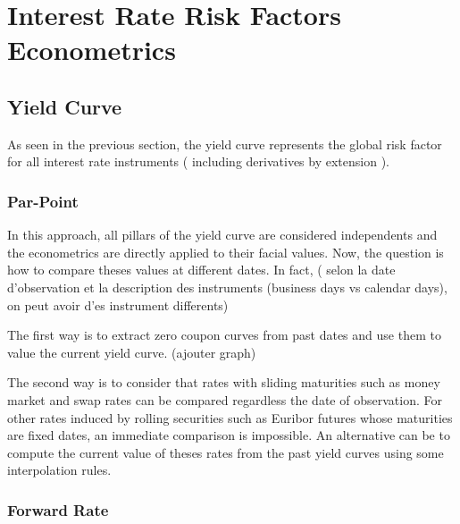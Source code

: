 \documentclass[3pt]{article}
\begin{document}
\bigskip

\bigskip

\bigskip

\bigskip

\bigskip

\bigskip

\bigskip

\section{Interest Rate Risk Factors Econometrics}

\subsection{Yield Curve}

\bigskip As seen in the previous section, the yield curve represents the
global risk factor for all interest rate instruments ( including derivatives
by extension ).

\subsubsection{Par-Point}

In this approach, all pillars of the yield curve are considered independents
and the econometrics are directly applied to their facial values. Now, the
question is how to compare theses values at different dates. In fact, (
selon la date d'observation et la description des instruments (business days
vs calendar days), on peut avoir d'es instrument differents)

\bigskip

The first way is to extract zero coupon curves from past dates and use them
to value the current yield curve. (ajouter graph)

\bigskip

\bigskip

\bigskip

The second way is to consider that rates with sliding maturities such as
money market and swap rates can be compared regardless the date of
observation. For other rates induced by rolling securities such as Euribor
futures whose maturities are fixed dates, an immediate comparison is
impossible. An alternative can be to compute the current value of theses
rates from the past yield curves using some interpolation rules.

\subsubsection{Forward Rate}
\end{document}
